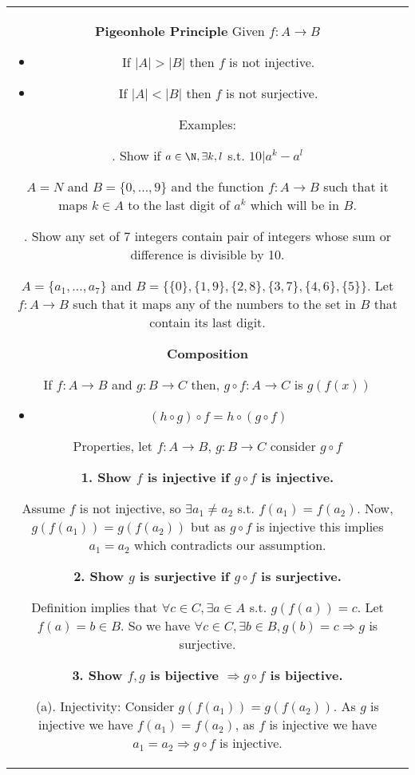 \documentclass[a4paper]{article}
\begin{document}
\begin{tabular}{@{}c@{}}
\begin{minipage}[t][\paperheight][t]{0.49\paperwidth}
        \textbf{Pigeonhole Principle}
        Given $f: A \rightarrow B$
         \begin{itemize}
            \item If $|A| > |B|$ then $f$ is not injective.
            \item If $|A| < |B|$ then $f$ is not surjective.
        \end{itemize}

        Examples:

        \qquad 1. Show if $a \in \N, \exists k,l$ s.t. $10|a^{k}-a^{l}$ 

        $A = N$ and $B = \{0,\dots,9\}$ and the function  $f:A \rightarrow B$ such that it maps $k \in A$ to the last digit of  $a^{k}$ which will be in $B$. 

        \qquad 2. Show any set of 7 integers contain pair of integers whose sum or difference is divisible by 10.

        $A = \{a_1,\dots,a_7\}$ and $B = \{\{0\}, \{1, 9\},\{2,8\},\{3,7\},\{4,6\},\{5\}\}$. Let  $f:A \rightarrow B$ such that it maps any of the numbers to the set in $B$ that contain its last digit. 


        \textbf{Composition}

    If $f:A \rightarrow B$ and $g:B \rightarrow C$ then, $g \circ f :A \rightarrow C$ is $g(f(x))$

    \begin{itemize}
\item $(h \circ g) \circ f = h \circ (g \circ f)$
    \end{itemize}

   Properties, let $f: A \rightarrow B$, $g: B \rightarrow C$ consider $g \circ f$

   \textbf{1. Show $f$ is injective if $g \circ f$ is injective.}
    
     Assume $f$ is not injective, so $\exists a_1\ne a_2$ s.t. $f(a_1) = f(a_2)$. Now, $g(f(a_1)) = g(f(a_2))$ but as $g\circ f$ is injective this implies $a_1 = a_2$ which contradicts our assumption.

    \textbf{2. Show $g$ is surjective if $g \circ f$ is surjective.}

     Definition implies that $\forall c \in C, \exists a \in A$ s.t. $g(f(a)) = c$. Let  $f(a) = b \in B$. So we have $\forall c \in C, \exists b \in B, g(b) = c \Rightarrow g$ is surjective.

    \textbf{3. Show $f,g$ is bijective $\Rightarrow g \circ f$ is bijective.}
    
    (a). Injectivity: Consider $g(f(a_1)) = g(f(a_2))$. As $g$ is injective we have $ f(a_1) = f(a_2)$, as $f$ is injective we have $a_1 = a_2 \Rightarrow g\circ f$ is injective.

    

    \end{minipage}%
    \end{tabular}%
\end{document}
